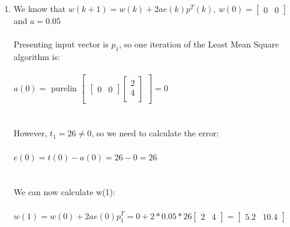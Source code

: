 \documentclass{article}
\begin{document}
\begin{enumerate}[label=\Alph*]
  \item We know that $w(k+1) = w(k) + 2ae(k)p^T(k)$, $w(0) = 
    \begin{bmatrix}
      0 & 0
    \end{bmatrix}$ and $a = 0.05$ \\ \\ Presenting input vector is $p_1$, so one iteration of the Least Mean Square algorithm is: \\ \\
    $a(0) =$ purelin $
    \begin{bmatrix}
      \begin{bmatrix}
        0 & 0
      \end{bmatrix}
      \begin{bmatrix}
        2 \\
        4 \\
      \end{bmatrix}
    \end{bmatrix} = 0$ \\ \\ \\However, $t_1 = 26 \neq 0$, so we need to calculate the error: \\ \\
    $e(0) = t(0) - a(0) = 26 - 0 = 26$ \\ \\ \\ We can now calculate w(1): \\ \\ $w(1) = w(0) +2ae(0)p_1^T = 0 + 2 * 0.05 * 26
    \begin{bmatrix}
      2 & 4
    \end{bmatrix} = 
    \begin{bmatrix}
      5.2 & 10.4
    \end{bmatrix}$
    
  
\end{enumerate}

\end{document}
